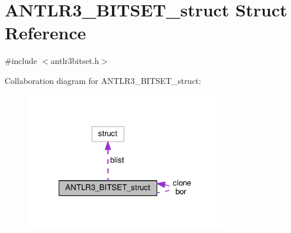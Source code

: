\hypertarget{struct_a_n_t_l_r3___b_i_t_s_e_t__struct}{\section{A\-N\-T\-L\-R3\-\_\-\-B\-I\-T\-S\-E\-T\-\_\-struct Struct Reference}
\label{struct_a_n_t_l_r3___b_i_t_s_e_t__struct}
}


{\ttfamily \#include $<$antlr3bitset.\-h$>$}



Collaboration diagram for A\-N\-T\-L\-R3\-\_\-\-B\-I\-T\-S\-E\-T\-\_\-struct\-:
\nopagebreak
\begin{figure}[H]
\begin{center}
\leavevmode
\includegraphics[width=249pt]{struct_a_n_t_l_r3___b_i_t_s_e_t__struct__coll__graph}
\end{center}
\end{figure}
